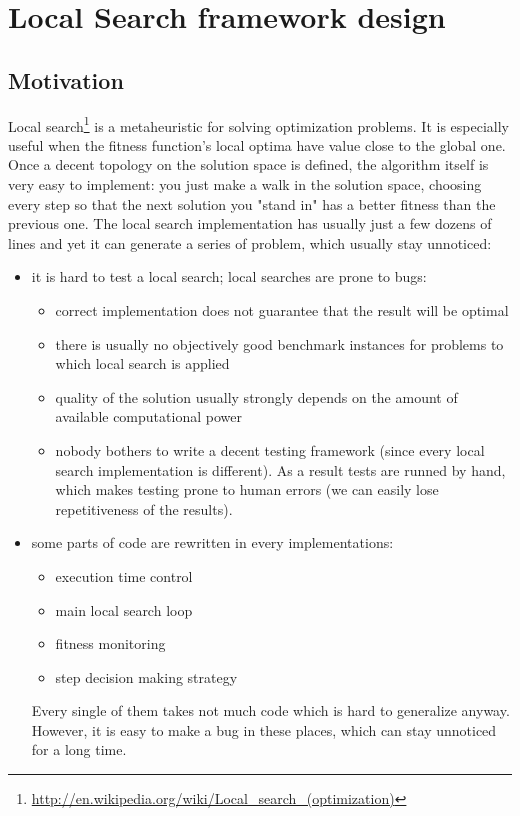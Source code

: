 \chapter{Local Search framework design}

\section{Motivation}

Local search\footnote{\url{http://en.wikipedia.org/wiki/Local_search_(optimization)}} is a metaheuristic for solving optimization problems.
It is especially useful when the fitness function's local optima have value close to the global one.
Once a decent topology on the solution space is defined, the algorithm itself is very easy to implement:
you just make a walk in the solution space, choosing every step so that the next solution you "stand in" has
a better fitness than the previous one. The local search implementation has usually just a few dozens of lines and
yet it can generate a series of problem, which usually stay unnoticed:
\begin{itemize}
\item it is hard to test a local search; local searches are prone to bugs:
	\begin{itemize}
	\item correct implementation does not guarantee that the result will be optimal
	\item there is usually no objectively good benchmark instances for problems to which local search is applied
	\item quality of the solution usually strongly depends on the amount of available computational power
	\item nobody bothers to write a decent testing framework (since every local search implementation is different).
		As a result tests are runned by hand, which makes testing prone to human errors (we can easily lose repetitiveness of the results).
	\end{itemize}
\item some parts of code are rewritten in every implementations:
	\begin{itemize}
	\item execution time control
	\item main local search loop
	\item fitness monitoring
	\item step decision making strategy
	\end{itemize}
	Every single of them takes not much code which is hard to generalize anyway.
	However, it is easy to make a bug in these places, which can stay unnoticed for a long time.
\end{itemize}

